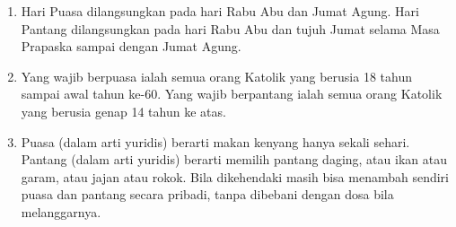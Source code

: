 \begin{enumerate}
\item Hari Puasa dilangsungkan pada hari Rabu Abu dan Jumat Agung. Hari Pantang dilangsungkan pada hari Rabu Abu dan tujuh Jumat selama Masa Prapaska sampai dengan Jumat Agung.

\item Yang wajib berpuasa ialah semua orang Katolik yang berusia 18 tahun sampai awal tahun ke-60. Yang wajib berpantang ialah semua orang Katolik yang berusia genap 14 tahun ke atas.

\item Puasa (dalam arti yuridis) berarti makan kenyang hanya sekali sehari. Pantang (dalam arti yuridis) berarti memilih pantang daging, atau ikan atau garam, atau jajan atau rokok. Bila dikehendaki masih bisa menambah sendiri puasa dan pantang secara pribadi, tanpa dibebani dengan dosa bila melanggarnya.
\end{enumerate}

